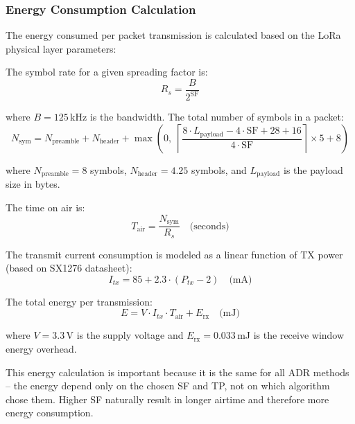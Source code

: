\documentclass[12pt,a4paper]{article}
\begin{document}
\subsubsection{Energy Consumption Calculation}

The energy consumed per packet transmission is calculated based on the LoRa physical layer parameters:

The symbol rate for a given spreading factor is:
\begin{equation}
    R_s = \frac{B}{2^{\text{SF}}}
    \label{eq:symbol_rate}
\end{equation}

where $B = 125$\,kHz is the bandwidth. The total number of symbols in a packet:
\begin{equation}
    N_{\text{sym}} = N_{\text{preamble}} + N_{\text{header}} + \max\left(0,\; \left\lceil \frac{8 \cdot L_{\text{payload}} - 4 \cdot \text{SF} + 28 + 16}{4 \cdot \text{SF}} \right\rceil \times 5 + 8\right)
    \label{eq:symbols}
\end{equation}

where $N_{\text{preamble}} = 8$ symbols, $N_{\text{header}} = 4.25$ symbols, and $L_{\text{payload}}$ is the payload size in bytes.

The time on air is:
\begin{equation}
    T_{\text{air}} = \frac{N_{\text{sym}}}{R_s} \quad \text{(seconds)}
    \label{eq:toa}
\end{equation}

The transmit current consumption is modeled as a linear function of TX power (based on SX1276 datasheet):
\begin{equation}
    I_{tx} = 85 + 2.3 \cdot (P_{tx} - 2) \quad \text{(mA)}
    \label{eq:tx_current}
\end{equation}

The total energy per transmission:
\begin{equation}
    E = V \cdot I_{tx} \cdot T_{\text{air}} + E_{\text{rx}} \quad \text{(mJ)}
    \label{eq:energy}
\end{equation}

where $V = 3.3$\,V is the supply voltage and $E_{\text{rx}} = 0.033$\,mJ is the receive window energy overhead.

This energy calculation is important because it is the same for all ADR methods -- the energy depend only on the chosen SF and TP, not on which algorithm chose them. Higher SF naturally result in longer airtime and therefore more energy consumption.
\end{document}
